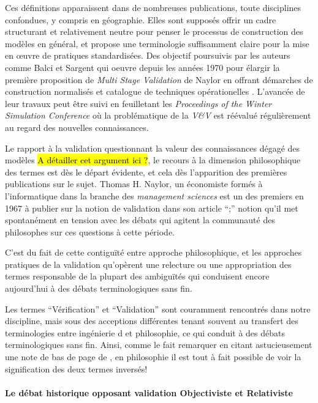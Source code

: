 Ces définitions apparaissent dans de nombreuses publications, toute disciplines confondues, y compris en géographie. Elles sont supposés offrir un cadre structurant et relativement neutre pour penser le processus de construction des modèles en général, et propose une terminologie suffisamment claire pour la mise en œuvre de pratiques standardisées. Des objectif poursuivis par les auteurs comme Balci et Sargent qui oeuvre depuis les années 1970 pour élargir la première proposition de \textit{Multi Stage Validation} de Naylor en offrant démarches de construction normalisés et catalogue de techniques opérationelles \autocite{Nance2002}. L'avancée de leur travaux peut être suivi en feuilletant les \textit{Proceedings of the Winter Simulation Conference} où la problématique de la \textit{V\&V} est réévalué régulièrement au regard des nouvelles connaissances. 

Le rapport à la validation questionnant la valeur des connaissances dégagé des modèles \hl{A détailler cet argument ici ?}, le recours à la dimension philosophique des termes est dès le départ évidente, et cela dès l'apparition des premières publications sur le sujet. Thomas H. Naylor, un économiste formés à l'informatique dans la branche des \textit{management sciences} \autocite{Stricklin1995} est un des premiers en 1967 \autocite{Naylor1967} à publier sur la notion de validation dans son article \foreignquote{Verification of Computer simulation models}; notion qu'il met spontanément en tension avec les débats qui agitent la communauté des philosophes sur ces questions à cette période. 

C'est du fait de cette contiguïté entre approche philosophique, et les approches pratiques de la validation qu'opèrent une relecture ou une appropriation des termes responsable de la plupart des ambiguïtés qui conduisent encore aujourd'hui à des débats terminologiques sans fin. \autocite{David2009}

Les termes \enquote{Vérification} et  \enquote{Validation} sont couramment rencontrés dans notre discipline, mais sous des acceptions différentes tenant souvent au transfert des terminologies entre ingénierie \autocite{Sargent1984} d\autocite{Balci1998} et philosophie, ce qui conduit à  des débats terminologiques sans fin. Ainsi, comme le fait remarquer \textcite{Kleijnen1995} en citant astucieusement une note de bas de page de \textcite{Barlas1990}, en philosophie il est tout à fait possible de voir la signification des deux termes inversés!

\paragraph{Le débat historique opposant validation Objectiviste et Relativiste}

